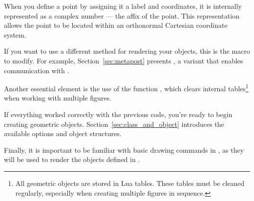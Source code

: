 When you define a point by assigning it a label and coordinates, it is internally represented as a complex number — the affix of the point. This representation allows the point to be located within an orthonormal Cartesian coordinate system.

If you want to use a different method for rendering your objects, this is the macro to modify. For example, Section~\ref{sec:metapost} presents , a variant that enables communication with .

Another essential element is the use of the function , which clears internal tables\footnote{All geometric objects are stored in Lua tables. These tables must be cleaned regularly, especially when creating multiple figures in sequence.} when working with multiple figures.

If everything worked correctly with the previous code, you're ready to begin creating geometric objects. Section~\ref{sec:class_and_object} introduces the available options and object structures.

Finally, it is important to be familiar with basic drawing commands in , as they will be used to render the objects defined in .


